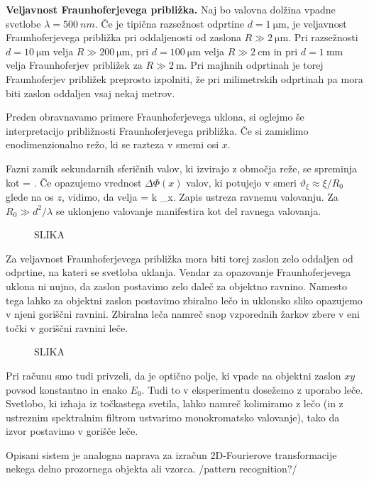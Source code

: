 \begin{example}{\bf Veljavnost Fraunhoferjevega približka.}
Naj bo valovna dolžina vpadne svetlobe $\lambda=500~\si{nm}$. Če je tipična 
razsežnost odprtine $d = 1~\si{\micro\metre}$, je veljavnost 
Fraunhoferjevega približka pri oddaljenosti od zaslona 
$R\gg 2~\si{\micro\metre}$. Pri razsežnosti
$d = 10~\si{\micro\metre}$ velja $R\gg 200~\si{\micro\metre}$, 
pri $d = 100~\si{\micro\metre}$ velja $R\gg 2~\si{\centi\metre}$ in 
pri $d = 1~\si{\milli\metre}$ velja Fraunhoferjev približek za
$R\gg 2~\si{\metre}$. Pri majhnih odprtinah je torej Fraunhoferjev približek
preprosto izpolniti, že pri milimetrskih odprtinah
pa mora biti zaslon oddaljen vsaj nekaj metrov. 
\end{example}

\begin{remark}
Preden obravnavamo primere Fraunhoferjevega uklona, si oglejmo še interpretacijo 
približnosti Fraunhoferjevega približka. Če si zamislimo enodimenzionalno režo, 
ki se razteza v smemi osi $x$. 

Fazni zamik sekundarnih sferičnih valov, ki izvirajo z območja reže, se spreminja kot
\beq
\Delta \Phi = .
\label{eq:05_20}
\eeq
Če opazujemo vrednost $\Delta \Phi(x)$ valov, ki potujejo v smeri $\vartheta_\xi \approx
\xi/R_0$ glede na os $z$, vidimo, da velja 
\beq
\Delta \Phi = k \varphi_\xi x.
\label{eq:05_21}
\eeq
Zapis ustreza ravnemu valovanju. Za $R_0 \gg d^2/\lambda$ se uklonjeno valovanje manifestira
kot del ravnega valovanja. 
\begin{figure}[h]
\centering
\def\svgwidth{120truemm} 
%
\caption{SLIKA}
\label{fig:05_priblizek}
\end{figure}
\end{remark}

Za veljavnost Fraunhoferjevega približka mora biti torej zaslon zelo
oddaljen od odprtine, na kateri se svetloba uklanja. Vendar za opazovanje 
Fraunhoferjevega uklona ni nujno, da zaslon postavimo zelo daleč za objektno ravnino.
Namesto tega lahko za objektni zaslon postavimo zbiralno lečo in uklonsko sliko opazujemo
v njeni goriščni ravnini. Zbiralna leča namreč snop vzporednih žarkov zbere v eni 
točki v goriščni ravnini leče. 
\begin{figure}[ht]
\centering
\def\svgwidth{120truemm} 
%
\caption{SLIKA}
\label{fig:05_2DFourier}
\end{figure}
Pri računu smo tudi privzeli, da je optično polje, ki vpade na objektni zaslon $xy$ povsod 
konstantno in enako $E_0$. Tudi to v eksperimentu dosežemo z uporabo leče. 
Svetlobo, ki izhaja iz točkastega svetila, lahko namreč kolimiramo z lečo (in z ustreznim
spektralnim filtrom ustvarimo monokromatsko valovanje), tako da izvor postavimo 
v gorišče leče.
\begin{remark}
Opisani sistem je analogna naprava za izračun 2D-Fourierove transformacije nekega 
delno prozornega objekta ali vzorca. /pattern recognition?/
\end{remark}

